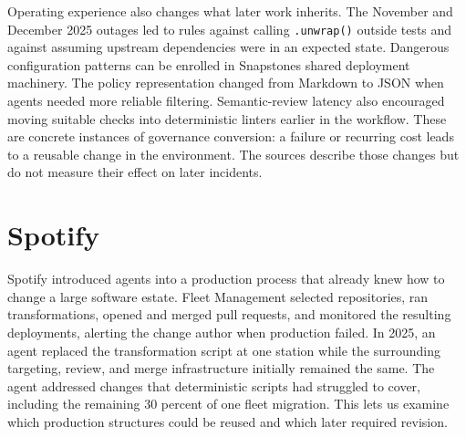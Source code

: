 
Operating experience also changes what later work inherits. The November and December 2025 outages led to rules against calling \texttt{.unwrap()} outside tests and against assuming upstream dependencies were in an expected state. Dangerous configuration patterns can be enrolled in Snapstone\textquotesingle s shared deployment machinery. The policy representation changed from Markdown to JSON when agents needed more reliable filtering\citep{hartman2026failsmall}. Semantic-review latency also encouraged moving suitable checks into deterministic linters earlier in the workflow\citep{reimann2026codex}. These are concrete instances of governance conversion: a failure or recurring cost leads to a reusable change in the environment. The sources describe those changes but do not measure their effect on later incidents.

\section{Spotify}\label{heading:spotify}


Spotify introduced agents into a production process that already knew how to change a large software estate. Fleet Management selected repositories, ran transformations, opened and merged pull requests, and monitored the resulting deployments, alerting the change author when production failed\citep{brown2023fleet}. In 2025, an agent replaced the transformation script at one station while the surrounding targeting, review, and merge infrastructure initially remained the same. The agent addressed changes that deterministic scripts had struggled to cover, including the remaining 30 percent of one fleet migration\citep{charas2025honk}. This lets us examine which production structures could be reused and which later required revision.



